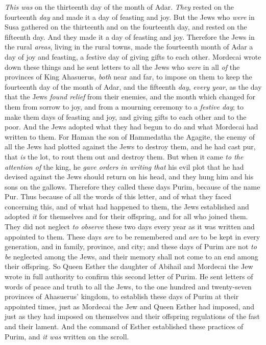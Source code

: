 \begin{biblechapter}
\verse \textit{This was} on the thirteenth day of the month of Adar. \textit{They} rested on the fourteenth \textit{day} and made it a day of feasting and joy.
\verse But the Jews who \textit{were} in Susa gathered on the thirteenth and on the fourteenth day, and rested on the fifteenth day. And they made it a day of feasting and joy.
\verse Therefore the Jews in the rural \textit{areas}, living in the rural towns, made the fourteenth month of Adar a day of joy and feasting, a festive day of giving gifts to each other.
 Mordecai wrote down these things and he sent letters to all the Jews who \textit{were} in all \textit{of} the provinces of King Ahasuerus, \textit{both} near and far,
\verse to impose on them to keep the fourteenth day of the month of Adar, and the fifteenth \textit{day}, \textit{every year},
\verse as the day that the Jews \textit{found relief} from their enemies, and the month which changed for them from sorrow to joy, and from a mourning ceremony to a \textit{festive day}; to make them days of feasting and joy, and giving gifts to each other and to the poor.
\verse And the Jews adopted what they had begun to do and what Mordecai had written to them.
\verse For Haman the son of Hammedatha the Agagite, the enemy of all the Jews had plotted against the Jews to destroy them, and he had cast pur, that \textit{is} the lot, to rout them out and destroy them.
\verse But when it came \textit{to the attention of} the king, he \textit{gave orders in writing} \textit{that} his evil plot that he had devised against the Jews should return on his head, and they hung him and his sons on the gallows.
\verse Therefore they called these days Purim, because of the name Pur. Thus because of all the words of this letter, and of what they faced concerning this, and of what had happened to them,
\verse the Jews established and adopted \textit{it} for themselves and for their offspring, and for all who joined them. They did not neglect \textit{to observe} these two days every year as it was written and appointed to them.
\verse These days \textit{are} to be remembered and \textit{are} to be kept in every generation, and in family, province, and city; and these days of Purim are not \textit{to be} neglected among the Jews, and their memory shall not come to an end among their offspring.
\verse So Queen Esther the daughter of Abihail and Mordecai the Jew wrote in full authority to confirm this second letter of Purim.
\verse He sent letters of words of peace and truth to all the Jews, to the one hundred and twenty-seven provinces of Ahasuerus’ kingdom,
\verse to establish these days of Purim at their appointed times, just as Mordecai the Jew and Queen Esther had imposed, and just as they had imposed on themselves and their offspring regulations of the fast and their lament.
\verse And the command of Esther established these practices of Purim, and \textit{it was} written on the scroll.
\end{biblechapter}

